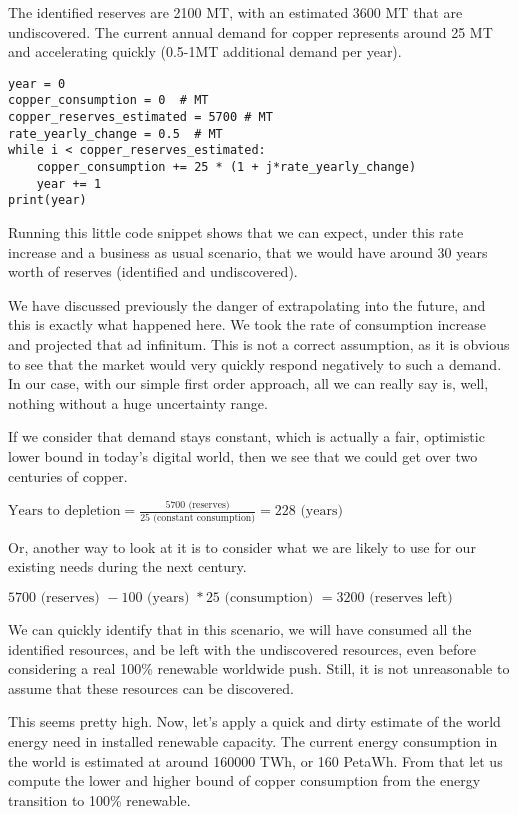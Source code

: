 The identified reserves are 2100 MT, with an estimated 3600 MT that are undiscovered. The current annual demand for copper represents around 25 MT and accelerating quickly (0.5-1MT additional demand per year). 

\begin{lstlisting}[caption={An example of an incorrect interpolation.}]
year = 0
copper_consumption = 0  # MT
copper_reserves_estimated = 5700 # MT
rate_yearly_change = 0.5  # MT
while i < copper_reserves_estimated:
    copper_consumption += 25 * (1 + j*rate_yearly_change)
    year += 1
print(year)
\end{lstlisting}

Running this little code snippet shows that we can expect, under this rate increase and a business as usual scenario, that we would have around 30 years worth of reserves (identified and undiscovered).

We have discussed previously the danger of extrapolating into the future, and this is exactly what happened here. We took the rate of consumption increase and projected that ad infinitum. This is not a correct assumption, as it is obvious to see that the market would very quickly respond negatively to such a demand. In our case, with our simple first order approach, all we can really say is, well, nothing without a huge uncertainty range.

If we consider that demand stays constant, which is actually a fair, optimistic lower bound in today's digital world, then we see that we could get over two centuries of copper.

$\textrm{Years to depletion} = \frac{5700 \textrm{ (reserves)}}{25 \textrm{ (constant consumption)}} = 228 \textrm{ (years)}$

Or, another way to look at it is to consider what we are likely to use for our existing needs during the next century.

$5700\textrm{ (reserves) } - 100\textrm{ (years) } * 25\textrm{ (consumption) } = 3200\textrm{ (reserves left)}$

We can quickly identify that in this scenario, we will have consumed all the identified resources, and be left with the undiscovered resources, even before considering a real 100\% renewable worldwide push. Still, it is not unreasonable to assume that these resources can be discovered.

This seems pretty high. Now, let's apply a quick and dirty estimate of the world energy need in installed renewable capacity. The current energy consumption in the world is estimated at around 160000 TWh, or 160 PetaWh. From that let us compute the lower and higher bound of copper consumption from the energy transition to 100\% renewable.

